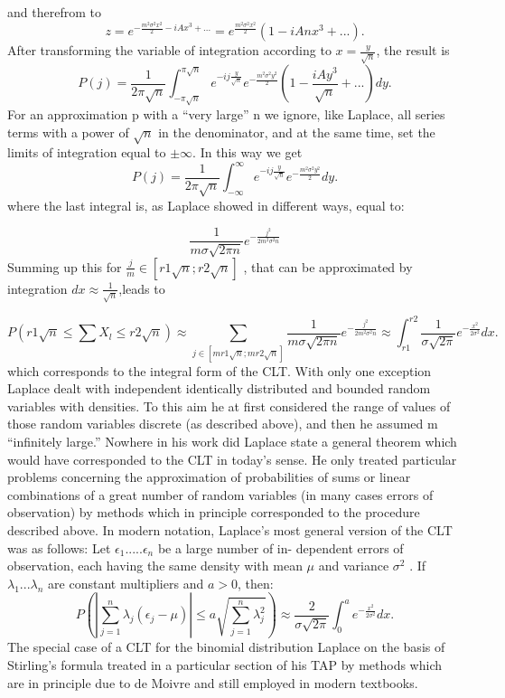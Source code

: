 \documentclass{article}
\begin{document}
and therefrom to
\[  z= e^{-\frac{m^2\sigma^2x^2}{2} -iAx^3 + ...}= e^{\frac{m^2\sigma^2x^2}{2}}(1-iAnx^3+...).   \]
After transforming the variable of integration according to $ x= \frac{y}{\sqrt{n}}$, the result is 
\[ P(j) = \frac{1}{2\pi\sqrt{n}} \int _{-\pi\sqrt{n}}^{\pi\sqrt{n}} e^{-ij\frac{y}{\sqrt{n}}}          e^{-\frac{m^2\sigma^2y^2}{2}}  ( 1 - \frac{iAy^3}{\sqrt{n}} + ...)  dy. \] For an approximation p with a “very large” n we ignore, like Laplace, all series terms  with a power of $ \sqrt{n}$ in the denominator, and at the same time, set the limits of integration equal to $\pm \infty$.   
In this way we get
\[ P(j) = \frac{1}{2\pi\sqrt{n}} \int _{- \infty}^{\infty}  e^{-ij\frac{y}{\sqrt{n}}}          e^{-\frac{m^2\sigma^2y^2}{2}}  dy. \]
where the last integral is, as Laplace showed in different ways, equal to:

\[  \frac{1}{m\sigma\sqrt{2\pi n}}e^{-\frac{j^2}{2m^2\sigma^2n}}  \]
Summing up this for $\frac{j}{m} \in [r1\sqrt{n};r2\sqrt{n}]$ , that can be approximated by integration $dx \approx \frac{1}{\sqrt{n}}$,leads to 

\[    P(r1\sqrt{n} \leq \sum X_l \leq r2\sqrt{n}) \approx \sum_{j\in[mr1\sqrt{n}; mr2\sqrt{n}]} \frac{1}{m\sigma\sqrt{2\pi n}} e^{-\frac{j^2}{2m^2\sigma^2n}} \approx \int_{r1}^{r2}\frac{1}{\sigma\sqrt{2\pi}}e^{-\frac{x^2}{2\sigma^2}} dx.  \]
which corresponds to the integral form of the CLT. With only one exception Laplace dealt with independent identically distributed and bounded
random variables with densities. 
To this aim he at first considered the range of values of those random variables discrete (as described above), and then he assumed m “infinitely large.”
Nowhere in his work did Laplace state a general theorem which would have
corresponded to the CLT in today’s sense.
He only treated particular problems concerning the approximation of probabilities of sums or linear combinations of a great
number of random variables (in many cases errors of observation)
by methods which in principle corresponded to the procedure described above.
In modern notation, Laplace’s most general version of the CLT 
was as follows: Let  $ \epsilon_1.....\epsilon_n$ be a large number of in-
dependent errors of observation, each having the same density with mean $\mu$ and
variance $ \sigma^2$ . If  $ \lambda_1 ... \lambda_n $ are constant multipliers and $a > 0$, then:
\[ P(|\sum_{j=1}^{n}\lambda_j(\epsilon_j -\mu)| \leq a \sqrt{\sum_{j=1}^n \lambda_j^2}  ) \approx \frac{2}{\sigma\sqrt{2\pi}}\int_0^a e^{-\frac{x^2}{2\sigma^2}} dx. \]
The special case of a CLT for the binomial distribution Laplace \cite{Laplace2012Pierre} on the basis of Stirling’s formula treated in a particular section of his TAP
by methods which are in principle due to de Moivre and still employed in modern textbooks. 
\end{document}
